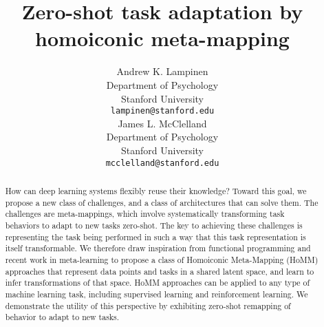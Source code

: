 \documentclass{article}
\begin{document}
\title{Zero-shot task adaptation by homoiconic meta-mapping}
\author{%
Andrew K. Lampinen\\
Department of Psychology\\
Stanford University\\
\texttt{lampinen@stanford.edu}\\
\And
James L. McClelland\\
Department of Psychology\\
Stanford University\\
\texttt{mcclelland@stanford.edu}\\
}
\date{}
\maketitle

\begin{abstract}
How can deep learning systems flexibly reuse their knowledge? Toward this goal, we propose a new class of challenges, and a class of architectures that can solve them. The challenges are meta-mappings, which involve systematically transforming task behaviors to adapt to new tasks zero-shot. The key to achieving these challenges is representing the task being performed in such a way that this task representation is itself transformable. We therefore draw inspiration from functional programming and recent work in meta-learning to propose a class of Homoiconic Meta-Mapping (HoMM) approaches that represent data points and tasks in a shared latent space, and learn to infer transformations of that space. HoMM approaches can be applied to any type of machine learning task, including supervised learning and reinforcement learning. We demonstrate the utility of this perspective by exhibiting zero-shot remapping of behavior to adapt to new tasks.
\end{abstract}

\vspace{-0.75em} %
\end{document}
